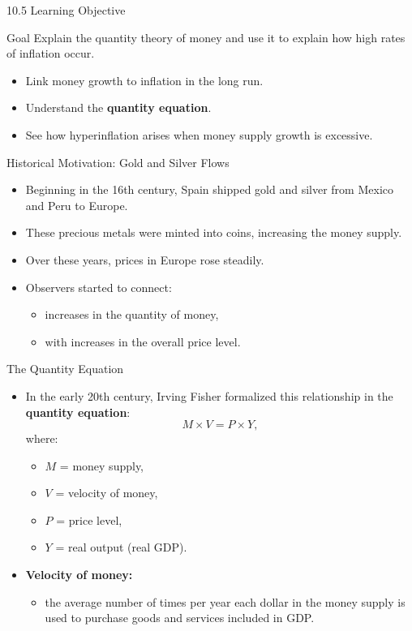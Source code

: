 \documentclass[aspectratio=169]{beamer}
\begin{document}
\begin{frame}{10.5 Learning Objective}
\transfade
\begin{block}{Goal}
Explain the quantity theory of money and use it to explain how high rates of inflation occur.
\end{block}
\begin{itemize}
  \item Link money growth to inflation in the long run.
  \item Understand the \textbf{quantity equation}.
  \item See how hyperinflation arises when money supply growth is excessive.
\end{itemize}
\end{frame}

\begin{frame}{Historical Motivation: Gold and Silver Flows}
\transfade
\begin{itemize}
  \item Beginning in the 16th century, Spain shipped gold and silver from Mexico and Peru to Europe.
  \item These precious metals were minted into coins, increasing the money supply.
  \item Over these years, prices in Europe rose steadily.
  \item Observers started to connect:
  \begin{itemize}
    \item increases in the quantity of money,
    \item with increases in the overall price level.
  \end{itemize}
\end{itemize}
\end{frame}

\begin{frame}{The Quantity Equation}
\transfade
\begin{itemize}
  \item In the early 20th century, Irving Fisher formalized this relationship in the \textbf{quantity equation}:
  \[
    M \times V = P \times Y,
  \]
  where:
  \begin{itemize}
    \item \(M\) = money supply,
    \item \(V\) = velocity of money,
    \item \(P\) = price level,
    \item \(Y\) = real output (real GDP).
  \end{itemize}
  \item \textbf{Velocity of money:}
  \begin{itemize}
    \item the average number of times per year each dollar in the money supply is used to purchase goods and services included in GDP.
  \end{itemize}
\end{itemize}
\end{frame}
\end{document}
